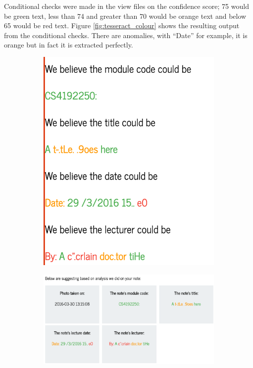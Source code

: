 {{{{{{{Conditional checks were made in the view files on the confidence score; 75 would be green text, less than 74 and greater than 70 would be orange text and below 65 would be red text. Figure \ref{fig:tesseract_colour} shows the resulting output from the conditional checks. There are anomalies, with ``Date'' for example, it is orange but in fact it is extracted perfectly.
\begin{figure}[H]
  \centering
  \begin{subfigure}[h]{0.35\textwidth}
    \includegraphics[scale=0.35]{images/tesseract_colour}
    \caption{}
    \label{fig:first_tesseract}
  \end{subfigure}
  \hspace{1em}
  \begin{subfigure}[h]{0.35\textwidth}
    \includegraphics[scale=0.3]{images/styled-tesseract-data}

\end{subfigure}
\end{figure}}}}}}}}
